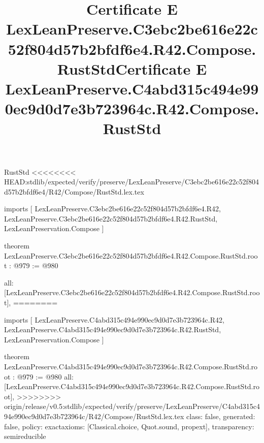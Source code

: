 \begin{lexlean}{RustStd}
<<<<<<<< HEAD:stdlib/expected/verify/preserve/LexLeanPreserve/C3ebc2be616e22c52f804d57b2bfdf6e4/R42/Compose/RustStd.lex.tex
\title{Certificate E LexLeanPreserve.C3ebc2be616e22c52f804d57b2bfdf6e4.R42.Compose.RustStd}
\begin{coremodule}
imports [
  LexLeanPreserve.C3ebc2be616e22c52f804d57b2bfdf6e4.R42,
  LexLeanPreserve.C3ebc2be616e22c52f804d57b2bfdf6e4.R42.RustStd,
  LexLeanPreservation.Compose
]

theorem LexLeanPreserve.C3ebc2be616e22c52f804d57b2bfdf6e4.R42.Compose.RustStd.root : @979 := @980 {
  all: [LexLeanPreserve.C3ebc2be616e22c52f804d57b2bfdf6e4.R42.Compose.RustStd.root],
========
\title{Certificate E LexLeanPreserve.C4abd315c494e990ec9d0d7e3b723964c.R42.Compose.RustStd}
\begin{coremodule}
imports [
  LexLeanPreserve.C4abd315c494e990ec9d0d7e3b723964c.R42,
  LexLeanPreserve.C4abd315c494e990ec9d0d7e3b723964c.R42.RustStd,
  LexLeanPreservation.Compose
]

theorem LexLeanPreserve.C4abd315c494e990ec9d0d7e3b723964c.R42.Compose.RustStd.root : @979 := @980 {
  all: [LexLeanPreserve.C4abd315c494e990ec9d0d7e3b723964c.R42.Compose.RustStd.root],
>>>>>>>> origin/release/v0.5:stdlib/expected/verify/preserve/LexLeanPreserve/C4abd315c494e990ec9d0d7e3b723964c/R42/Compose/RustStd.lex.tex
  class: false,
  generated: false,
  policy: exact{axioms: [Classical.choice, Quot.sound, propext]},
  transparency: semireducible
}


\end{coremodule}}
\end{coremodule}
\end{lexlean}

